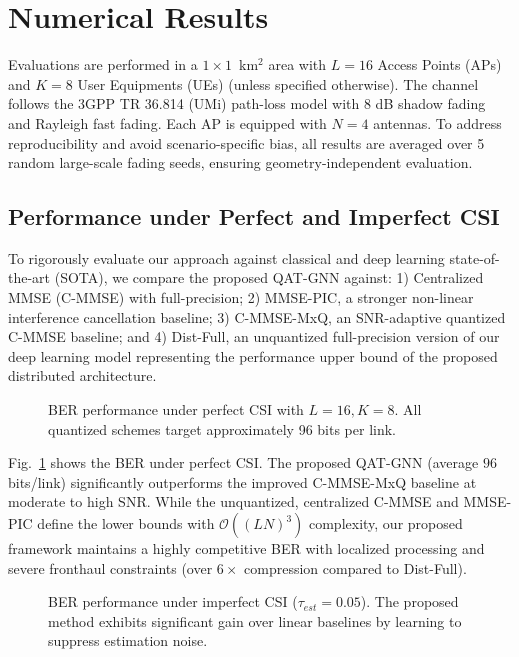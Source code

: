\section{Numerical Results}

Evaluations are performed in a $1 \times 1$~km$^2$ area with $L=16$ Access Points (APs) and $K=8$ User Equipments (UEs) (unless specified otherwise). The channel follows the 3GPP TR 36.814 (UMi) path-loss model with 8 dB shadow fading and Rayleigh fast fading. Each AP is equipped with $N=4$ antennas. To address reproducibility and avoid scenario-specific bias, all results are averaged over 5 random large-scale fading seeds, ensuring geometry-independent evaluation.

\subsection{Performance under Perfect and Imperfect CSI}
To rigorously evaluate our approach against classical and deep learning state-of-the-art (SOTA), we compare the proposed QAT-GNN against: 1) Centralized MMSE (C-MMSE) with full-precision; 2) MMSE-PIC, a stronger non-linear interference cancellation baseline; 3) C-MMSE-MxQ, an SNR-adaptive quantized C-MMSE baseline; and 4) Dist-Full, an unquantized full-precision version of our deep learning model representing the performance upper bound of the proposed distributed architecture.

\begin{figure}[t]
    \centering
    
    \caption{BER performance under perfect CSI with $L=16, K=8$. All quantized schemes target approximately 96 bits per link.}
    \label{fig:perfect_csi}
\end{figure}

Fig.~\ref{fig:perfect_csi} shows the BER under perfect CSI. The proposed QAT-GNN (average $96$ bits/link) significantly outperforms the improved C-MMSE-MxQ baseline at moderate to high SNR. While the unquantized, centralized C-MMSE and MMSE-PIC define the lower bounds with $\mathcal{O}((LN)^3)$ complexity, our proposed framework maintains a highly competitive BER with localized processing and severe fronthaul constraints (over $6\times$ compression compared to Dist-Full).

\begin{figure}[t]
    \centering
    
    \caption{BER performance under imperfect CSI ($\tau_{est}=0.05$). The proposed method exhibits significant gain over linear baselines by learning to suppress estimation noise.}
    \label{fig:imperfect_csi}
\end{figure}


